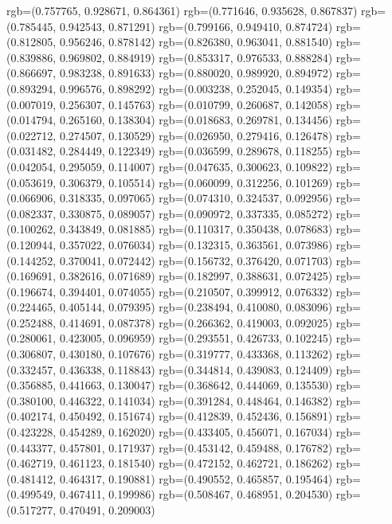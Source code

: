 {{{					rgb=(0.757765, 0.928671, 0.864361)
					rgb=(0.771646, 0.935628, 0.867837)
					rgb=(0.785445, 0.942543, 0.871291)
					rgb=(0.799166, 0.949410, 0.874724)
					rgb=(0.812805, 0.956246, 0.878142)
					rgb=(0.826380, 0.963041, 0.881540)
					rgb=(0.839886, 0.969802, 0.884919)
					rgb=(0.853317, 0.976533, 0.888284)
					rgb=(0.866697, 0.983238, 0.891633)
					rgb=(0.880020, 0.989920, 0.894972)
					rgb=(0.893294, 0.996576, 0.898292)
					rgb=(0.003238, 0.252045, 0.149354)
					rgb=(0.007019, 0.256307, 0.145763)
					rgb=(0.010799, 0.260687, 0.142058)
					rgb=(0.014794, 0.265160, 0.138304)
					rgb=(0.018683, 0.269781, 0.134456)
					rgb=(0.022712, 0.274507, 0.130529)
					rgb=(0.026950, 0.279416, 0.126478)
					rgb=(0.031482, 0.284449, 0.122349)
					rgb=(0.036599, 0.289678, 0.118255)
					rgb=(0.042054, 0.295059, 0.114007)
					rgb=(0.047635, 0.300623, 0.109822)
					rgb=(0.053619, 0.306379, 0.105514)
					rgb=(0.060099, 0.312256, 0.101269)
					rgb=(0.066906, 0.318335, 0.097065)
					rgb=(0.074310, 0.324537, 0.092956)
					rgb=(0.082337, 0.330875, 0.089057)
					rgb=(0.090972, 0.337335, 0.085272)
					rgb=(0.100262, 0.343849, 0.081885)
					rgb=(0.110317, 0.350438, 0.078683)
					rgb=(0.120944, 0.357022, 0.076034)
					rgb=(0.132315, 0.363561, 0.073986)
					rgb=(0.144252, 0.370041, 0.072442)
					rgb=(0.156732, 0.376420, 0.071703)
					rgb=(0.169691, 0.382616, 0.071689)
					rgb=(0.182997, 0.388631, 0.072425)
					rgb=(0.196674, 0.394401, 0.074055)
					rgb=(0.210507, 0.399912, 0.076332)
					rgb=(0.224465, 0.405144, 0.079395)
					rgb=(0.238494, 0.410080, 0.083096)
					rgb=(0.252488, 0.414691, 0.087378)
					rgb=(0.266362, 0.419003, 0.092025)
					rgb=(0.280061, 0.423005, 0.096959)
					rgb=(0.293551, 0.426733, 0.102245)
					rgb=(0.306807, 0.430180, 0.107676)
					rgb=(0.319777, 0.433368, 0.113262)
					rgb=(0.332457, 0.436338, 0.118843)
					rgb=(0.344814, 0.439083, 0.124409)
					rgb=(0.356885, 0.441663, 0.130047)
					rgb=(0.368642, 0.444069, 0.135530)
					rgb=(0.380100, 0.446322, 0.141034)
					rgb=(0.391284, 0.448464, 0.146382)
					rgb=(0.402174, 0.450492, 0.151674)
					rgb=(0.412839, 0.452436, 0.156891)
					rgb=(0.423228, 0.454289, 0.162020)
					rgb=(0.433405, 0.456071, 0.167034)
					rgb=(0.443377, 0.457801, 0.171937)
					rgb=(0.453142, 0.459488, 0.176782)
					rgb=(0.462719, 0.461123, 0.181540)
					rgb=(0.472152, 0.462721, 0.186262)
					rgb=(0.481412, 0.464317, 0.190881)
					rgb=(0.490552, 0.465857, 0.195464)
					rgb=(0.499549, 0.467411, 0.199986)
					rgb=(0.508467, 0.468951, 0.204530)
					rgb=(0.517277, 0.470491, 0.209003)
}}}
